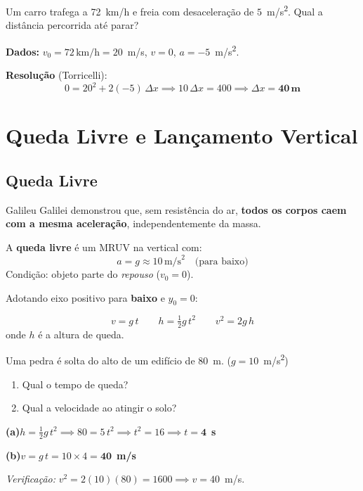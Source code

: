 \documentclass[12pt,a4paper]{article}
\begin{document}
\begin{tcolorbox}[exemplobox={Exemplo 4 --- Frenagem}]
  Um carro trafega a 72~km/h e freia com desacelera\c{c}\~ao de
  $5$~m/s\textsuperscript{2}. Qual a dist\^ancia percorrida at\'e parar?

  \medskip
  \textbf{Dados:} $v_0 = 72\,\text{km/h} = 20$~m/s,\; $v = 0$,\; $a = -5$~m/s\textsuperscript{2}.

  \medskip
  \textbf{Resolu\c{c}\~ao} (Torricelli):
  \[
    0 = 20^2 + 2(-5)\,\Delta x \implies 10\,\Delta x = 400
    \implies \Delta x = \mathbf{40\,\text{m}}
  \]
\end{tcolorbox}


\section{Queda Livre e Lan\c{c}amento Vertical}

\subsection{Queda Livre}

Galileu Galilei demonstrou que, sem resist\^encia do ar,
\textbf{todos os corpos caem com a mesma acelera\c{c}\~ao}, independentemente
da massa.

\begin{tcolorbox}[defbox={Queda Livre}]
  A \textbf{queda livre} \'e um MRUV na vertical com:
  \[
    a = g \approx 10\,\text{m/s}^2 \quad \text{(para baixo)}
  \]
  Condi\c{c}\~ao: objeto parte do \emph{repouso} ($v_0 = 0$).
\end{tcolorbox}

Adotando eixo positivo para \textbf{baixo} e $y_0 = 0$:

\begin{tcolorbox}[formulabox={Equa\c{c}\~oes da Queda Livre}]
  \[
    v = g\,t \qquad h = \tfrac{1}{2}g\,t^2 \qquad v^2 = 2g\,h
  \]
  onde $h$ \'e a altura de queda.
\end{tcolorbox}

\begin{tcolorbox}[exemplobox={Exemplo 5 --- Queda de uma pedra}]
  Uma pedra \'e solta do alto de um edif\'icio de 80~m. ($g = 10$~m/s\textsuperscript{2})
  \begin{enumerate}[label=(\alph*), nosep]
    \item Qual o tempo de queda?
    \item Qual a velocidade ao atingir o solo?
  \end{enumerate}

  \medskip
  \textbf{(a)}\quad $h = \tfrac{1}{2}g\,t^2 \implies 80 = 5\,t^2
    \implies t^2 = 16 \implies t = \mathbf{4}$~\textbf{s}

  \textbf{(b)}\quad $v = g\,t = 10 \times 4 = \mathbf{40}$~\textbf{m/s}

  \smallskip
  \textit{Verifica\c{c}\~ao:} $v^2 = 2(10)(80) = 1600 \implies v = 40$~m/s.\ \checkmark
\end{tcolorbox}
\end{document}
